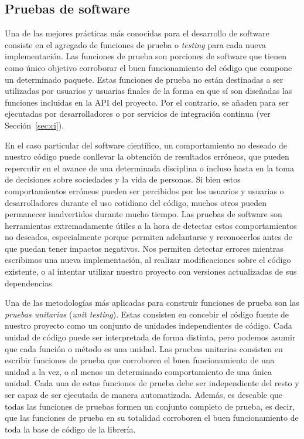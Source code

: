 \subsection{Pruebas de software}

Una de las mejores prácticas más conocidas para el desarrollo de software
consiste en el agregado de funciones de prueba o \emph{testing} para cada nueva
implementación.
Las funciones de prueba son porciones de software que tienen como único
objetivo corroborar el buen funcionamiento del código que compone un
determinado paquete.
Estas funciones de prueba no están destinadas a ser utilizadas por usuarios
y usuarias finales de la forma en que sí son diseñadas las funciones incluidas
en la \ac{API} del proyecto.
Por el contrario, se añaden para ser ejecutadas por desarrolladores o por
servicios de integración continua (ver Sección~\ref{sec:ci}).

En el caso particular del software científico, un comportamiento no deseado de
nuestro código puede conllevar la obtención de resultados erróneos, que pueden
repercutir en el avance de una determinada disciplina o incluso hasta en la
toma de decisiones sobre sociedades y la vida de personas.
Si bien estos comportamientos erróneos pueden ser percibidos por los usuarios
y usuarias o desarrolladores durante el uso cotidiano del código, muchos otros
pueden permanecer inadvertidos durante mucho tiempo.
Las pruebas de software son herramientas extremadamente útiles a la hora de
detectar estos comportamientos no deseados, especialmente porque permiten
adelantarse y reconocerlos antes de que puedan tener impactos negativos.
Nos permiten detectar errores mientras escribimos una nueva implementación, al
realizar modificaciones sobre el código existente, o al intentar utilizar
nuestro proyecto con versiones actualizadas de sus dependencias.

Una de las metodologías más aplicadas para construir funciones de prueba son
las \emph{pruebas unitarias} (\emph{unit testing}).
Estas consisten en concebir el código fuente de nuestro proyecto como un
conjunto de unidades independientes de código.
Cada unidad de código puede ser interpretada de forma distinta, pero podemos
asumir que cada función o método es una unidad.
Las pruebas unitarias consisten en escribir funciones de prueba que corroboren
el buen funcionamiento de una unidad a la vez, o al menos un determinado
comportamiento de una única unidad.
Cada una de estas funciones de prueba debe ser independiente del resto y ser
capaz de ser ejecutada de manera automatizada.
Además, es deseable que todas las funciones de pruebas formen un conjunto
completo de prueba, es decir, que las funciones de prueba en su totalidad
corroboren el buen funcionamiento de toda la base de código de la librería.


